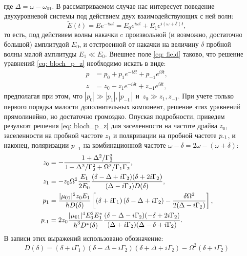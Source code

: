 где $\Delta = \omega - \omega_{01}$.
В рассматриваемом случае нас интересует поведение двухуровневой системы под действием двух взаимодействующих с ней волн:
\begin{equation}
\tilde{E}(t) = Ee^{-i\omega t} = E_0e^{i\omega t} + E_1e^{i(\omega+\delta) t},
\label{eq: field}
\end{equation}
то есть, под действием волны накачки c произвольной (и возможно, достаточно большой) амплитудой $E_0$, и отстроенной от накачки на величину $\delta$ пробной волны малой амплитуды $E_1 \ll E_0$. Внешнее поле \eqref{eq: field} таково, что решение уравнений \eqref{eq: bloch_p_z} необходимо искать в виде:
\begin{align}
p &= p_0 + p_1 e^{-i\delta t} + p_{-1}e^{i\delta t}, \\
z &= z_0 + z_1 e^{-i\delta t} + z_{-1}e^{i\delta t},
\label{eq: sol_bloch_WM}
\end{align}
предполагая при этом, что $|p_0| \gg |p_1|, |p_{-1}|$~и~$z_0 \gg z_1, z_{-1}$.  При учете только первого порядка малости дополнительных компонент, решение этих уравнений прямолинейно, но достаточно громоздко. Опуская подробности, приведем результат решения \eqref{eq: bloch_p_z} для заселенности на частоте драйва $z_0$, заселенности на пробной частоте $z_1$ и поляризации на пробной частоте $p_{\operatorname{-1}}$, и наконец, поляризации $p_{-1}$ на  комбинационной частоте $\omega-\delta = 2\omega - (\omega+\delta)$:
\begin{align}
z_0 &=  - {{1+\Delta^2/\Gamma_2^2} \over {1+ \Delta^2/\Gamma^2_2 + \Omega^2/\Gamma_1\Gamma_2}}, \label{eq: z_0} \\
z_1 &=   - z_0\Omega^2{{E_1} \over {2E_0}} \frac{(\delta-\Delta + i\Gamma_2)(\delta+2i\Gamma_2)}{(\Delta-i\Gamma_2)D(\delta)}, \\
p_1 &=  \frac{|\mu_{01}|^2z_0E_1}{\hbar D(\delta)}\left[\left(\delta + i\Gamma_1\right)\left(\delta-\Delta+i\Gamma_2\right)-\frac{\delta\Omega^2}{2(\Delta-i\Gamma_2)}\right], \label{eq: p1}\\
p_{\m} &=  2 z_0 \frac{|\mu_{01}|^4E_0^2E_1^*}{\hbar^3 D^*(\delta)}\frac{(\delta-\Delta-i\Gamma_2)(-\delta+2i\Gamma_2)}
{(\Delta + i\Gamma_2)(\Delta-\delta+i\Gamma_2)}. \label{eq: p-1}
\end{align}
В записи этих выражений использовано обозначение:
\begin{equation}
D(\delta) = \left( \delta + i\Gamma_1\right) \left(\delta-\Delta +i\Gamma_2\right) \left(\delta+\Delta +i\Gamma_2\right)-\Omega^2\left(\delta+i\Gamma_2\right)
\end{equation}
